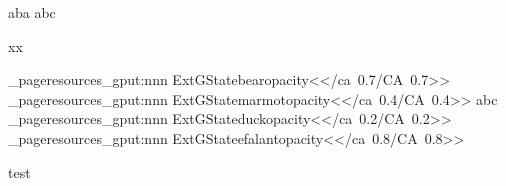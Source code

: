 \documentclass{article}
\begin{document}
aba \newpage abc\newpage

xx
\ExplSyntaxOn



\pdf_pageresources_gput:nnn {ExtGState}{bearopacity}{<</ca~0.7/CA~0.7>>}
\pdf_pageresources_gput:nnn {ExtGState}{marmotopacity}{<</ca~0.4/CA~0.4>>}
abc
\newpage
\pdf_pageresources_gput:nnn {ExtGState}{duckopacity}{<</ca~0.2/CA~0.2>>}
\pdf_pageresources_gput:nnn {ExtGState}{efalantopacity}{<</ca~0.8/CA~0.8>>}

test%
\ExplSyntaxOff
\end{document}
